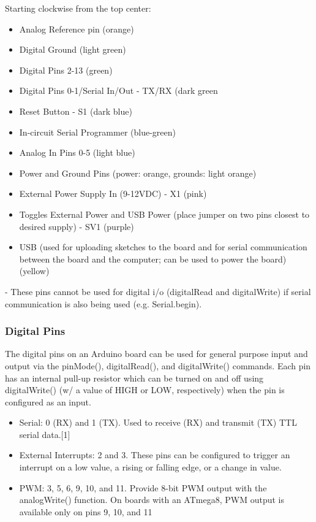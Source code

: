     
    Starting clockwise from the top center:
    \begin{itemize}
    \item Analog Reference pin (orange)
    \item Digital Ground (light green)
    \item Digital Pins 2-13 (green)
    \item Digital Pins 0-1/Serial In/Out - TX/RX (dark green
    \item  Reset Button - S1 (dark blue)
    \item  In-circuit Serial Programmer (blue-green)
    \item  Analog In Pins 0-5 (light blue)
    \item  Power and Ground Pins (power: orange, grounds: light orange)
    \item  External Power Supply In (9-12VDC) - X1 (pink)
    \item  Toggles External Power and USB Power (place jumper on two pins closest to desired supply) -
    SV1 (purple)
    \item  USB (used for uploading sketches to the board and for serial communication between the board
    and the computer; can be used to power the board) (yellow)
    \end{itemize}
    
    \par- These pins cannot be used for digital i/o (digitalRead and digitalWrite) if serial communication is also being used (e.g. Serial.begin).
        \subsubsection{Digital Pins}
        The digital pins on an Arduino board can be used for general purpose input and output via the pinMode(), digitalRead(), and digitalWrite() commands. Each pin has an internal pull-up resistor which
        can be turned on and off using digitalWrite() (w/ a value of HIGH or LOW, respectively) when the
        pin is configured as an input.
        \begin{itemize}
        \item Serial: 0 (RX) and 1 (TX). Used to receive (RX) and transmit (TX) TTL serial data.[1]
        \item External Interrupts: 2 and 3. These pins can be configured to trigger an interrupt on a low
        value, a rising or falling edge, or a change in value.
        \item PWM: 3, 5, 6, 9, 10, and 11. Provide 8-bit PWM output with the analogWrite() function. On
        boards with an ATmega8, PWM output is available only on pins 9, 10, and 11
        \end{itemize}
    
